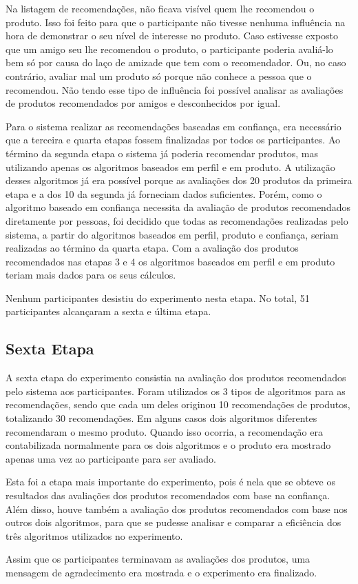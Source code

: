Na listagem de recomendações, não ficava visível quem lhe recomendou o produto. Isso foi feito para que o participante não tivesse nenhuma influência na hora de demonstrar o seu nível de interesse no produto. Caso estivesse exposto que um amigo seu lhe recomendou o produto, o participante poderia avaliá-lo bem só por causa do laço de amizade que tem com o recomendador. Ou, no caso contrário, avaliar mal um produto só porque não conhece a pessoa que o recomendou. Não tendo esse tipo de influência foi possível analisar as avaliações de produtos recomendados por amigos e desconhecidos por igual.

Para o sistema realizar as recomendações baseadas em confiança, era necessário que a terceira e quarta etapas fossem finalizadas por todos os participantes. Ao término da segunda etapa o sistema já poderia recomendar produtos, mas utilizando apenas os algoritmos baseados em perfil e em produto. A utilização desses algoritmos já era possível porque as avaliações dos 20 produtos da primeira etapa e a dos 10 da segunda já forneciam dados suficientes. Porém, como o algoritmo baseado em confiança necessita da avaliação de produtos recomendados diretamente por pessoas, foi decidido que todas as recomendações realizadas pelo sistema, a partir do algoritmos baseados em perfil, produto e confiança, seriam realizadas ao término da quarta etapa. Com a avaliação dos produtos recomendados nas etapas 3 e 4 os algoritmos baseados em perfil e em produto teriam mais dados para os seus cálculos.

Nenhum participantes desistiu do experimento nesta etapa. No total, 51 participantes alcançaram a sexta e última etapa.

\subsection{Sexta Etapa}

A sexta etapa do experimento consistia na avaliação dos produtos recomendados pelo sistema aos participantes. Foram utilizados os 3 tipos de algoritmos para as recomendações, sendo que cada um deles originou 10 recomendações de produtos, totalizando 30 recomendações. Em alguns casos dois algoritmos diferentes recomendaram o mesmo produto. Quando isso ocorria, a recomendação era contabilizada normalmente para os dois algoritmos e o produto era mostrado apenas uma vez ao participante para ser avaliado.


Esta foi a etapa mais importante do experimento, pois é nela que se obteve os resultados das avaliações dos produtos recomendados com base na confiança. Além disso, houve também a avaliação dos produtos recomendados com base nos outros dois algoritmos, para que se pudesse analisar e comparar a eficiência dos três algoritmos utilizados no experimento.

Assim que os participantes terminavam as avaliações dos produtos, uma mensagem de agradecimento era mostrada e o experimento era finalizado.